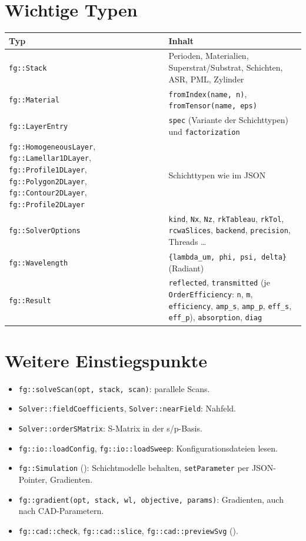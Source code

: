 \section{Wichtige Typen}
\begin{center}
\small
\begin{tabularx}{\linewidth}{>{\raggedright\arraybackslash}p{5.6cm}Y}
\toprule
Typ & Inhalt \\
\midrule
\texttt{fg::Stack} & Perioden, Materialien, Superstrat/Substrat, Schichten, ASR, PML, Zylinder \\
\texttt{fg::Material} & \texttt{fromIndex(name, n)}, \texttt{fromTensor(name, eps)} \\
\texttt{fg::LayerEntry} & \texttt{spec} (Variante der Schichttypen) und \texttt{factorization} \\
\texttt{fg::HomogeneousLayer}, \texttt{fg::Lamellar1DLayer}, \texttt{fg::Profile1DLayer}, \texttt{fg::Polygon2DLayer},
\texttt{fg::Contour2DLayer}, \texttt{fg::Profile2DLayer} & Schichttypen wie im JSON \\
\texttt{fg::SolverOptions} & \texttt{kind}, \texttt{Nx}, \texttt{Nz}, \texttt{rkTableau}, \texttt{rkTol},
\texttt{rcwaSlices}, \texttt{backend}, \texttt{precision}, Threads \ldots \\
\texttt{fg::Wavelength} & \texttt{\{lambda\_um, phi, psi, delta\}} (Radiant) \\
\texttt{fg::Result} & \texttt{reflected}, \texttt{transmitted} (je \texttt{OrderEfficiency}: \texttt{n}, \texttt{m},
\texttt{efficiency}, \texttt{amp\_s}, \texttt{amp\_p}, \texttt{eff\_s}, \texttt{eff\_p}), \texttt{absorption},
\texttt{diag} \\
\bottomrule
\end{tabularx}
\end{center}

\section{Weitere Einstiegspunkte}
\begin{itemize}
  \item \texttt{fg::solveScan(opt, stack, scan)}: parallele Scans.
  \item \texttt{Solver::fieldCoefficients}, \texttt{Solver::nearField}: Nahfeld.
  \item \texttt{Solver::orderSMatrix}: S-Matrix in der s/p-Basis.
  \item \texttt{fg::io::loadConfig}, \texttt{fg::io::loadSweep}: Konfigurationsdateien lesen.
  \item \texttt{fg::Simulation} (): Schichtmodelle behalten, \texttt{setParameter}
        per JSON-Pointer, Gradienten.
  \item \texttt{fg::gradient(opt, stack, wl, objective, params)}: Gradienten, auch nach CAD-Parametern.
  \item \texttt{fg::cad::check}, \texttt{fg::cad::slice}, \texttt{fg::cad::previewSvg} ().
\end{itemize}


